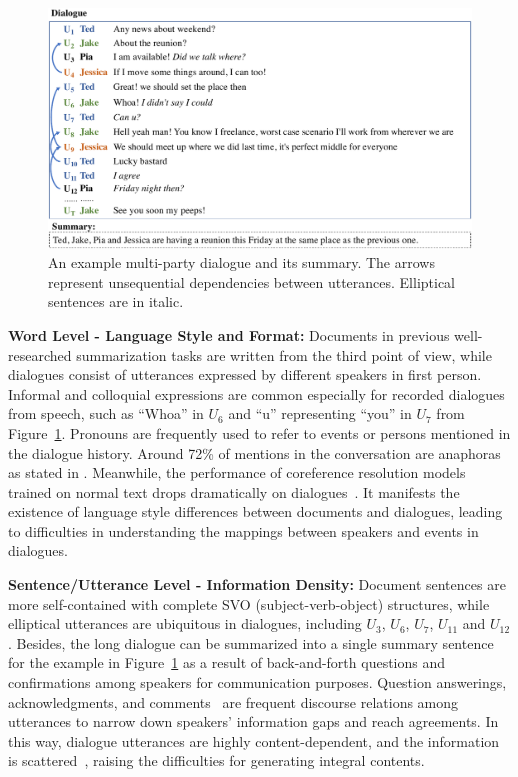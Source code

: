 \begin{figure}[ht]
	\centering
	\includegraphics[scale=0.5]{fig/example.pdf}
	\caption{An example multi-party dialogue and its summary. The arrows represent unsequential dependencies between utterances. Elliptical sentences are in italic.}
	\label{fig:example}
\end{figure}

\textbf{Word Level - Language Style and Format:} 
Documents in previous well-researched summarization tasks are written from the third point of view, while dialogues consist of utterances expressed by different speakers in first person. Informal and colloquial expressions are common especially for recorded dialogues from speech, such as ``Whoa'' in $U_6$ and ``u'' representing ``you'' in $U_7$ from Figure~\ref{fig:example}.
Pronouns are frequently used to refer to events or persons mentioned in the dialogue history. Around 72\% of mentions in the conversation are {anaphoras} %
as stated in \citet{bai2021joint}. Meanwhile, the performance of coreference resolution models trained on normal text drops dramatically on dialogues~\cite{liu2021coreference}. It manifests the existence of language style differences between documents and dialogues, leading to difficulties in understanding the mappings between speakers and events in dialogues.


\textbf{Sentence/Utterance Level - Information Density:}
Document sentences are more self-contained with complete SVO (subject-verb-object) structures, while elliptical utterances are ubiquitous in dialogues, including $U_3$, $U_6$, $U_7$, $U_{11}$ and $U_{12}$.
Besides, the long dialogue can be summarized into a single summary sentence for the example in Figure~\ref{fig:example} as a result of back-and-forth questions and confirmations among speakers for communication purposes.
Question answerings, acknowledgments, and comments~\cite{asher2016discourse} are frequent discourse relations among utterances to narrow down speakers' information gaps and reach agreements.
In this way, dialogue utterances are highly content-dependent, and the information is scattered~\cite{zhang2021exploratory}, raising the difficulties for generating integral contents.

